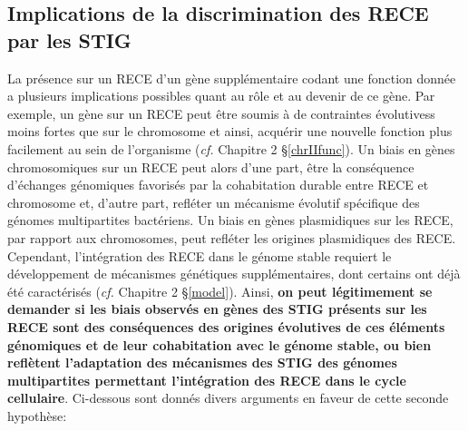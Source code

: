 		
\subsection{Implications de la discrimination des RECE par les STIG}	
	La présence sur un RECE d'un gène supplémentaire codant une fonction donnée a plusieurs implications possibles quant au rôle et au devenir de ce gène. Par exemple, un gène sur un RECE peut être soumis à de contraintes évolutivess moins fortes que sur le chromosome et ainsi, acquérir une nouvelle fonction plus facilement au sein de l'organisme (\textit{cf.} Chapitre 2 \S  \ref{chrIIfunc}). Un biais en gènes chromosomiques sur un RECE peut alors d'une part, être la conséquence d'échanges génomiques favorisés par la cohabitation durable entre RECE et chromosome et, d'autre part, refléter un mécanisme évolutif spécifique des génomes multipartites bactériens. Un biais en gènes plasmidiques sur les RECE, par rapport aux chromosomes, peut refléter les origines plasmidiques des RECE. Cependant, l'intégration des RECE dans le génome stable requiert le développement de mécanismes génétiques supplémentaires, dont certains ont déjà été caractérisés (\textit{cf.} Chapitre 2 \S \ref{model}). Ainsi, \textbf{on peut légitimement se demander si les biais observés en gènes des STIG présents sur les RECE sont des conséquences des origines évolutives de ces éléments génomiques et de leur cohabitation avec le génome stable, ou bien reflètent l'adaptation des mécanismes des STIG des génomes multipartites permettant l'intégration des RECE dans le cycle cellulaire}. Ci-dessous sont donnés divers arguments en faveur de cette seconde hypothèse:
